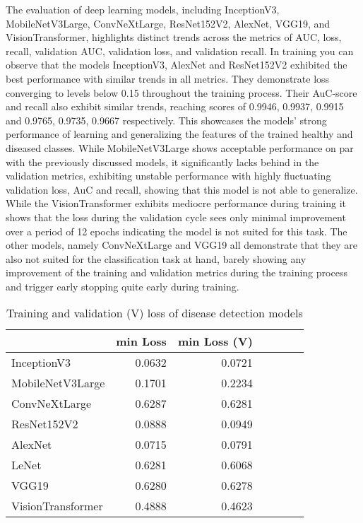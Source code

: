 \documentclass[draft,final]{vutinfth} %
\begin{document}
\begin{appendix}
The evaluation of deep learning models, including InceptionV3, MobileNetV3Large, ConvNeXtLarge, ResNet152V2, AlexNet, VGG19, and VisionTransformer, highlights distinct trends across the metrics of AUC, loss, recall, validation AUC, validation loss, and validation recall. In training you can observe that the models InceptionV3, AlexNet and ResNet152V2 exhibited the best performance with similar trends in all metrics. They demonstrate loss converging to levels below 0.15 throughout the training process. Their AuC-score and recall also exhibit similar trends, reaching scores of 0.9946, 0.9937, 0.9915 and 0.9765, 0.9735, 0.9667 respectively. This showcases the models' strong performance of learning and generalizing the features of the trained healthy and diseased classes. While MobileNetV3Large shows acceptable performance on par with the previously discussed models, it significantly lacks behind in the validation metrics, exhibiting unstable performance with highly fluctuating validation loss, AuC and recall, showing that this model is not able to generalize. While the VisionTransformer exhibits mediocre performance during training it shows that the loss during the validation cycle sees only minimal improvement over a period of 12 epochs indicating the model is not suited for this task. The other models, namely ConvNeXtLarge and VGG19 all demonstrate that they are also not suited for the classification task at hand, barely showing any improvement of the training and validation metrics during the training process and trigger early stopping quite early during training.

\begin{table}[]
    \centering
    \begin{tabular}{lrrrrrr}
    \toprule
    & min Loss & min Loss (V) \\
    \midrule
    InceptionV3 & 0.0632 & 0.0721 \\
    MobileNetV3Large & 0.1701 & 0.2234 \\
    ConvNeXtLarge & 0.6287 & 0.6281 \\
    ResNet152V2 & 0.0888 & 0.0949 \\
    AlexNet & 0.0715 & 0.0791 \\
    LeNet & 0.6281 & 0.6068 \\
    VGG19 & 0.6280 & 0.6278 \\
    VisionTransformer & 0.4888 & 0.4623 \\
    \bottomrule
    \end{tabular}
    \caption{Training and validation (V) loss of disease detection models}
    \label{tab:disease_detection_losses}
\end{table}


\end{appendix}
\end{document}
